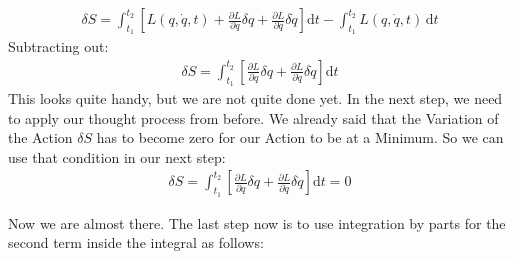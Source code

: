     \begin{align}
        \delta S = \int_{t_1}^{t_2} \left[L(q,\dot{q}, t) + \frac{\partial L}{\partial q}\delta q +\frac{\partial L}{\partial \dot{q}}\delta\dot{q}\right] \text{d}t - \int_{t_1}^{t_2} L(q,\dot{q}, t)\, \text{d}t 
    \end{align}
    Subtracting out:
    \begin{align}
        \delta S = \int_{t_1}^{t_2}\left[ \frac{\partial L}{\partial q}\delta q +\frac{\partial L}{\partial \dot{q}}\delta\dot{q} \right] \text{d}t
    \end{align}
    This looks quite handy, but we are not quite done yet. In the next step, we need to apply our thought process from before. We already said that the Variation of the Action $\delta S $ has to become zero for our Action to be at a Minimum. So we can use that condition in our next step:
    \begin{align}
        \delta S = \int_{t_1}^{t_2}\left[ \frac{\partial L}{\partial q}\delta q +\frac{\partial L}{\partial \dot{q}}\delta\dot{q} \right] \text{d}t = 0 
    \end{align}
    
    Now we are almost there. The last step now is to use integration by parts for the second term inside the integral as follows:
    

